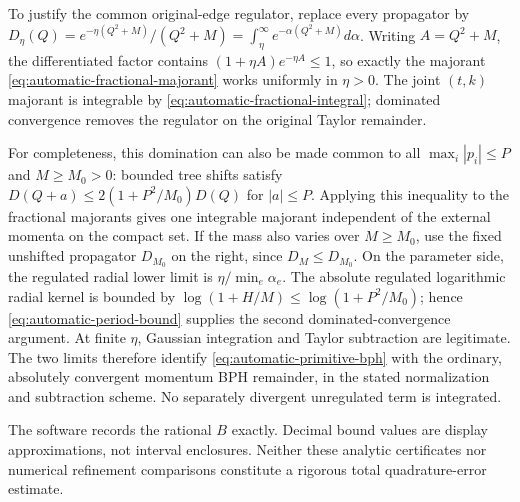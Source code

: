 To justify the common original-edge regulator, replace every propagator by
$D_\eta(Q)=e^{-\eta(Q^2+M)}/(Q^2+M)
=\int_\eta^\infty e^{-\alpha(Q^2+M)}d\alpha$.
Writing $A=Q^2+M$, the differentiated factor contains
$(1+\eta A)e^{-\eta A}\leq1$, so exactly the majorant
\eqref{eq:automatic-fractional-majorant} works uniformly in $\eta>0$.
The joint $(t,k)$ majorant is integrable by
\eqref{eq:automatic-fractional-integral}; dominated convergence removes
the regulator on the original Taylor remainder.

For completeness, this domination can also be made common to all
$\max_i|p_i|\leq P$ and $M\geq M_0>0$: bounded tree shifts satisfy
$D(Q+a)\leq2(1+P^2/M_0)D(Q)$ for $|a|\leq P$.
Applying this inequality to the fractional majorants gives one integrable
majorant independent of the external momenta on the compact set.  If the
mass also varies over $M\geq M_0$, use the fixed unshifted propagator
$D_{M_0}$ on the right, since $D_M\leq D_{M_0}$.
On the parameter side, the regulated radial lower limit is
$\eta/\min_e\alpha_e$.  The absolute regulated logarithmic radial kernel
is bounded by $\log(1+H/M)\leq\log(1+P^2/M_0)$; hence
\eqref{eq:automatic-period-bound} supplies the second dominated-convergence
argument.  At finite $\eta$, Gaussian integration and Taylor subtraction
are legitimate.  The two limits therefore identify
\eqref{eq:automatic-primitive-bph} with the ordinary, absolutely convergent
momentum BPH remainder, in the stated normalization and subtraction
scheme.  No separately divergent unregulated term is integrated.

The software records the rational $B$ exactly.  Decimal bound values are
display approximations, not interval enclosures.  Neither these analytic
certificates nor numerical refinement comparisons constitute a rigorous
total quadrature-error estimate.
